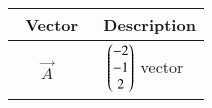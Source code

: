 \begin{tabular}[12pt]{ |c| c|}
    \hline
    \ Vector & \ Description\\ 
    \hline
	$\vec{A}$ & $\begin{pmatrix}-2\\-1\\2\end{pmatrix}$ vector\\
   \hline
    \end{tabular}